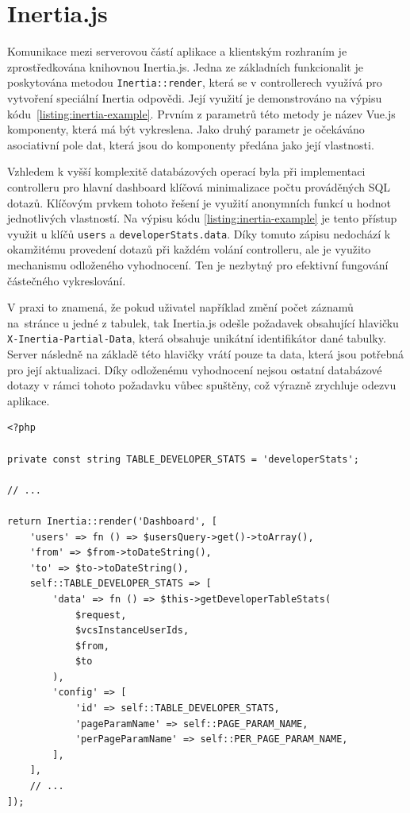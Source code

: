 \section{Inertia.js}
Komunikace mezi serverovou částí aplikace a klientským rozhraním je zprostředkována knihovnou Inertia.js. Jedna ze základních funkcionalit je poskytována metodou \texttt{Inertia::render}, která se v controllerech využívá pro vytvoření speciální Inertia odpovědi. Její využití je demonstrováno na výpisu kódu~\ref{listing:inertia-example}. Prvním z parametrů této metody je název Vue.js komponenty, která má být vykreslena. Jako druhý parametr je očekáváno asociativní pole dat, která jsou do komponenty předána jako její vlastnosti.

Vzhledem k vyšší komplexitě databázových operací byla při implementaci controlleru pro hlavní dashboard klíčová minimalizace počtu prováděných SQL dotazů. Klíčovým prvkem tohoto řešení je využití anonymních funkcí u hodnot jednotlivých vlastností. Na výpisu kódu \ref{listing:inertia-example} je tento přístup využit u klíčů \texttt{users} a \texttt{developerStats.data}. Díky tomuto zápisu nedochází k okamžitému provedení dotazů při každém volání controlleru, ale je využito mechanismu odloženého vyhodnocení. Ten je nezbytný pro efektivní fungování částečného vykreslování.

V praxi to znamená, že pokud uživatel například změní počet záznamů na~stránce u jedné z tabulek, tak Inertia.js odešle požadavek obsahující hlavičku \texttt{X-Inertia-Partial-Data}, která obsahuje unikátní identifikátor dané tabulky. Server následně na základě této hlavičky vrátí pouze ta data, která jsou potřebná pro její aktualizaci. Díky odloženému vyhodnocení nejsou ostatní databázové dotazy v rámci tohoto požadavku vůbec spuštěny, což výrazně zrychluje odezvu aplikace.

\begin{listing}[h!]
    \caption{Předávání dat knihovně Inertia.js}\label{listing:inertia-example}
    \begin{verbatim}
<?php

private const string TABLE_DEVELOPER_STATS = 'developerStats';

// ...

return Inertia::render('Dashboard', [
    'users' => fn () => $usersQuery->get()->toArray(),
    'from' => $from->toDateString(),
    'to' => $to->toDateString(),
    self::TABLE_DEVELOPER_STATS => [
        'data' => fn () => $this->getDeveloperTableStats(
            $request,
            $vcsInstanceUserIds,
            $from,
            $to
        ),
        'config' => [
            'id' => self::TABLE_DEVELOPER_STATS,
            'pageParamName' => self::PAGE_PARAM_NAME,
            'perPageParamName' => self::PER_PAGE_PARAM_NAME,
        ],
    ],
    // ...
]);
    \end{verbatim}
\end{listing}
